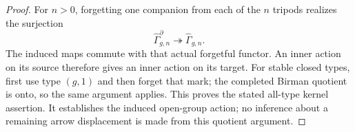 \begin{proof}
For $n>0$, forgetting one companion from each
of the $n$ tripods realizes the surjection
\[
 \widehat\Gamma_{g,n}^{\partial}
          \twoheadrightarrow\widehat\Gamma_{g,n}.             \tag{E.125}
\]
The induced maps commute with that actual
forgetful functor.  An inner action on its
source therefore gives an inner action on
its target.  For stable closed types, first
use type $(g,1)$ and then forget that mark;
the completed Birman quotient is onto, so
the same argument applies.  This proves
the stated all-type kernel assertion.
It establishes the induced open-group action;
no inference about a remaining arrow displacement
is made from this quotient argument.
\end{proof}
